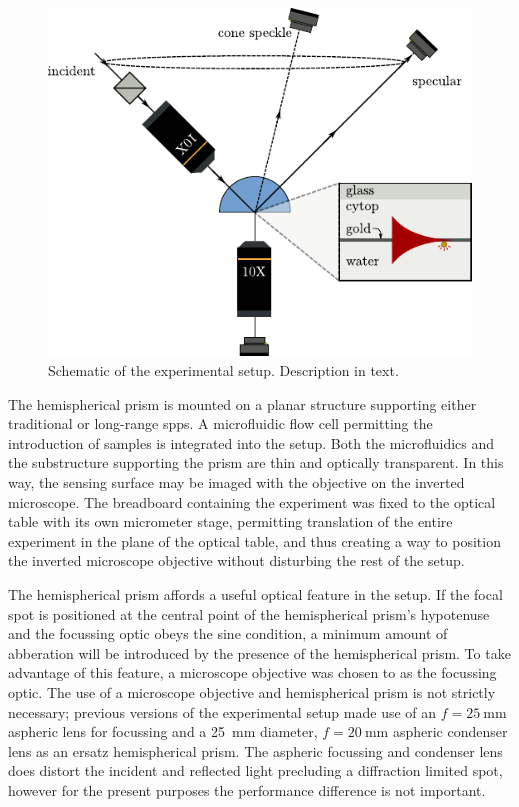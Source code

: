 \begin{figure}[ht]
  \centering
  \includegraphics[keepaspectratio]{experimental/figures/conefig.pdf}
  \caption{Schematic of the experimental setup.  Description in text.}
  \label{fig:experimentalsetup}
\end{figure}

The hemispherical prism is mounted on a planar structure supporting either
traditional or long-range \glspl{spp}.  A microfluidic flow cell permitting the
introduction of samples is integrated into the setup.  Both the microfluidics
and the substructure supporting the prism are thin and optically transparent.
In this way, the sensing surface may be imaged with the objective on the
inverted microscope.  The breadboard containing the experiment was fixed to
the optical table with its own micrometer stage, permitting translation of the
entire experiment in the plane of the optical table, and thus creating a way
to position the inverted microscope objective without disturbing the rest of
the setup.

The hemispherical prism affords a useful optical feature in the setup.  If the
focal spot is positioned at the central point of the hemispherical prism's
hypotenuse and the focussing optic obeys the sine condition, a minimum amount
of abberation will be introduced by the presence of the hemispherical prism.
To take advantage of this feature, a microscope objective was chosen to as the
focussing optic.  The use of a microscope objective and hemispherical prism is
not strictly necessary; previous versions of the experimental setup made use
of an $f=\SI{25}{\milli\meter}$ aspheric lens for focussing and
a \SI{25}{\milli\meter} diameter, $f=\SI{20}{\milli\meter}$ aspheric condenser
lens as an ersatz hemispherical prism.  The aspheric focussing and condenser
lens does distort the incident and reflected light precluding a diffraction
limited spot, however for the present purposes the performance difference is
not important.

